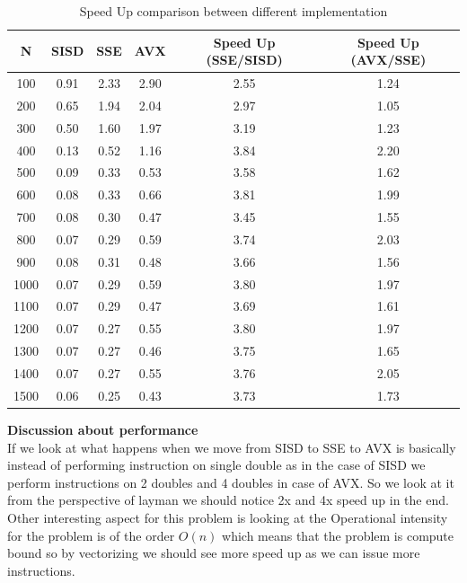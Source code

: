 \documentclass[letterpaper, 11pt]{article}
\begin{document}
\begin{table}[]
\centering
\label{table1}
\begin{tabular}{|c|c|c|c|c|c|}
\hline
N    & SISD      & SSE      & AVX      & Speed Up (SSE/SISD) & Speed Up (AVX/SSE) \\ \hline
100  & 0.91 & 2.33 & 2.90 & 2.55         & 1.24        \\ \hline
200  & 0.65 & 1.94 & 2.04 & 2.97         & 1.05        \\ \hline
300  & 0.50 & 1.60 & 1.97 & 3.19         & 1.23        \\ \hline
400  & 0.13 & 0.52 & 1.16 & 3.84         & 2.20        \\ \hline
500  & 0.09 & 0.33 & 0.53 & 3.58         & 1.62        \\ \hline
600  & 0.08 & 0.33 & 0.66 & 3.81         & 1.99        \\ \hline
700  & 0.08 & 0.30 & 0.47 & 3.45         & 1.55        \\ \hline
800  & 0.07 & 0.29 & 0.59 & 3.74         & 2.03        \\ \hline
900  & 0.08 & 0.31 & 0.48 & 3.66         & 1.56        \\ \hline
1000 & 0.07 & 0.29 & 0.59 & 3.80         & 1.97        \\ \hline
1100 & 0.07 & 0.29 & 0.47 & 3.69         & 1.61        \\ \hline
1200 & 0.07 & 0.27 & 0.55 & 3.80         & 1.97        \\ \hline
1300 & 0.07 & 0.27 & 0.46 & 3.75         & 1.65        \\ \hline
1400 & 0.07 & 0.27 & 0.55 & 3.76         & 2.05        \\ \hline
1500 & 0.06 & 0.25 & 0.43 & 3.73         & 1.73        \\ \hline
\end{tabular}
\caption{Speed Up comparison between different implementation}
\end{table}
\textbf{Discussion about performance}\\
If we look at what happens when we move from SISD to SSE to AVX is basically instead of performing instruction on single double as in the case of SISD we perform instructions on 2 doubles and 4 doubles in case of AVX. So we look at it from the perspective of layman we should notice 2x and 4x speed up in the end. Other interesting aspect for this problem is looking at the Operational intensity for the problem is of the order $O(n)$ which means that the problem is compute bound so by vectorizing we should see more speed up as we can issue more instructions.
\bigskip
\end{document}
